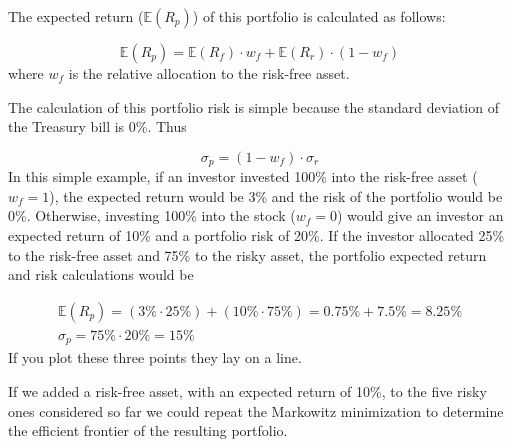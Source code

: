 The expected return (\(\mathbb{E}(R_p)\)) of this portfolio is calculated as follows:

\begin{equation*} 
\mathbb{E}(R_p) = \mathbb{E}(R_f)\cdot w_f + \mathbb{E}(R_r)\cdot (1- w_f) 
\end{equation*}
where \(w_f\) is the relative allocation to the risk-free asset.

The calculation of this portfolio risk is simple because the standard deviation of the Treasury bill is 0\%. Thus

\begin{equation*} 
\sigma_p = (1-w_f)\cdot \sigma_r 
\end{equation*}
In this simple example, if an investor invested 100\% into the risk-free asset (\(w_f=1\)), the expected return would be 3\% and the risk of the portfolio would be 0\%. Otherwise, investing 100\% into the stock (\(w_f=0\)) would give an investor an expected return of 10\% and a portfolio risk of 20\%. If the investor allocated 25\% to the risk-free asset and 75\% to the risky asset, the portfolio expected return and risk calculations would be

\begin{equation*}
\begin{gathered}
\mathbb{E}(R_p) = (3\% \cdot 25\%) + (10\% \cdot 75\%) = 0.75\% + 7.5\% = 8.25\% \\
\sigma_p = 75\% \cdot 20\% = 15\% 
\end{gathered}
\end{equation*}
\noindent
If you plot these three points they lay on a line.

If we added a risk-free asset, with an expected return of 10\%, to the five risky ones considered so far we could repeat the Markowitz minimization to determine the efficient frontier of the resulting portfolio. 

